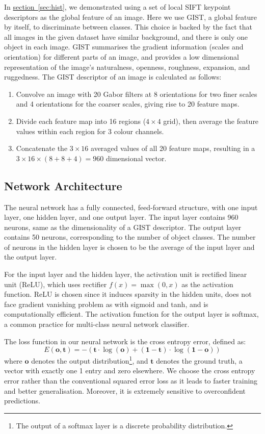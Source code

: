 \documentclass[11pt,a4paper]{article}
\begin{document}
In \hyperref[sec:hist]{section~\ref{sec:hist}}, we demonstrated using a set of local SIFT keypoint descriptors as the global feature of an image. Here we use GIST\cite{oliva2001modeling}, a global feature by itself, to discriminate between classes. This choice is backed by the fact that all images in the given dataset have similar background, and there is only one object in each image. GIST summarises the gradient information (scales and orientation) for different parts of an image, and provides a low dimensional representation of the image's naturalness, openness, roughness, expansion, and ruggedness. The GIST descriptor of an image is calculated as follows:
\begin{enumerate}[topsep=0.5em, itemsep=-0.5ex]
\item Convolve an image with 20 Gabor filters at 8 orientations for two finer scales and 4
orientations for the coarser scales, giving rise to 20 feature maps.
\item Divide each feature map into 16 regions ($4\times4$ grid), then average the feature values
within each region for 3 colour channels.
\item Concatenate the $3\times16$ averaged values of all 20 feature maps, resulting in a $3\times16\times(8+8+4)=960$ dimensional vector.
\end{enumerate}

\subsection{Network Architecture}

The neural network has a fully connected, feed-forward structure, with one input layer, one hidden layer, and one output layer. The input layer contains 960 neurons, same as the dimensionality of a GIST descriptor. The output layer contains 50 neurons, corresponding to the number of object classes. The number of neurons in the hidden layer is chosen to be the average of the input layer and the output layer.

For the input layer and the hidden layer, the activation unit is rectified linear unit
(ReLU), which uses rectifier $f(x)=\operatorname{max}(0,x)$ as the activation function. ReLU is chosen since it induces sparsity in the hidden units, does not face gradient vanishing problem as with sigmoid and tanh, and is computationally efficient. The activation function for the output layer is softmax, a common practice for multi-class neural network classifier.

The loss function in our neural network is the cross entropy error, defined as:
\[E(\mathbf{o},\mathbf{t})=-\left(\mathbf{t}\cdot\log(\mathbf{o})+(\mathbf{1}-\mathbf{t})\cdot\log(\mathbf{1}-\mathbf{o})\right)\]
where $\mathbf{o}$ denotes the output distribution\footnote{The output of a softmax layer is a discrete probability distribution.}, and $\mathbf{t}$ denotes the ground truth, a vector with exactly one 1 entry and zero elsewhere. We choose the cross entropy error rather than the conventional squared error loss as it leads to faster training and better generalisation. Moreover, it is extremely sensitive to overconfident predictions\cite{mccaffrey2013cross}.
\end{document}
